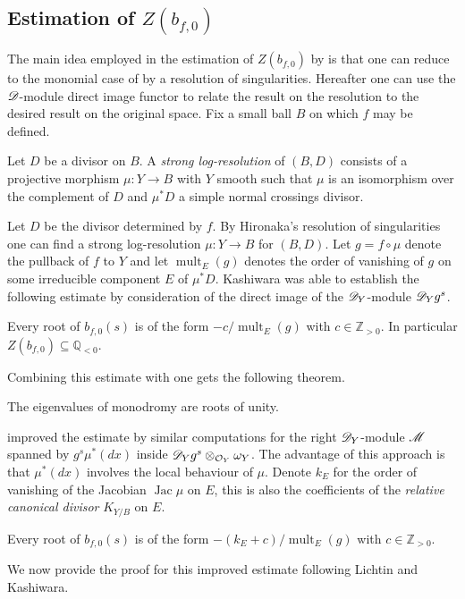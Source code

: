 \subsection{Estimation of $Z(b_{f,0})$}\label{sec: Estimation}
The main idea employed in the estimation of $Z(b_{f,0})$ by \cite{kashiwara1976b} is that one can reduce to the monomial case of  by a resolution of singularities.
Hereafter one can use the $\mathscr{D}$-module direct image functor to relate the result on the resolution to the desired result on the original space.
Fix a small ball $B$ on which $f$ may be defined.
\begin{definition}
  Let $D$ be a divisor on $B$.
  A {\it strong log-resolution} of $(B,D)$ consists of a projective morphism $\mu:Y\to B$  with $Y$ smooth such that $\mu$ is an isomorphism over the complement of $D$ and $\mu^*D$ a simple normal crossings divisor.
\end{definition}
Let $D$ be the divisor determined by $f$.
By Hironaka's resolution of singularities one can find a strong log-resolution $\mu:Y\to B$ for $(B,D)$.
Let $g = f\circ \mu$ denote the pullback of $f$ to $Y$ and let $\operatorname{mult}_{E}(g)$ denotes the order of vanishing of $g$ on some irreducible component $E$ of $\mu^*D$.
Kashiwara was able to establish the following estimate by consideration of the direct image of the $\mathscr{D}_Y$-module $\mathscr{D}_Y g^s$.
\begin{theorem}{\cite[Corollary 5.2]{kashiwara1976b}}
  Every root of $b_{f,0}(s)$ is of the form $ -c/\operatorname{mult}_{E}(g) $ with $c\in \mathbb{Z}_{>0}$.
  In particular $Z(b_{f,0})\subseteq \mathbb{Q}_{<0}$.
\end{theorem}
Combining this estimate with  one gets the following theorem.
\begin{theorem}
  The eigenvalues of monodromy are roots of unity.
\end{theorem}
\cite{lichtin1989poles} improved the estimate by similar computations for the right $\mathscr{D}_Y$-module $\mathscr{M}$ spanned by $g^s \mu^*(dx)$ inside $\mathscr{D}_Yg^s\otimes_{\mathcal{O}_Y} \omega_Y$.
The advantage of this approach is that $\mu^*(dx)$ involves the local behaviour of $\mu$.
Denote $k_E$ for the order of vanishing of the Jacobian $\operatorname{Jac}\mu$ on $E$, this is also the coefficients of the {\it relative canonical divisor} $K_{Y/B}$ on $E$.
\begin{theorem}{\cite[Theorem 5]{lichtin1989poles}}\label{thm: LichtinEstimate}
  Every root of $b_{f,0}(s)$ is of the form $-(k_E + c)/\operatorname{mult}_{E}(g)$ with $c\in \mathbb{Z}_{>0}$.
\end{theorem}
We now provide the proof for this improved estimate following Lichtin and Kashiwara.
\\

